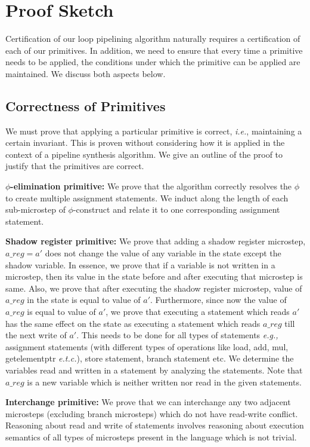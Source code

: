 \section{Proof Sketch}
\label{sec:proof}

Certification of our loop pipelining algorithm naturally requires a certification of each of our primitives. In addition, we need to ensure that every time a primitive needs to be applied, the conditions under which the primitive can be applied are maintained. We discuss both aspects below.

\subsection{Correctness of Primitives}
We must prove that applying a particular primitive is correct, 
{\em i.e.}, maintaining a certain invariant. This is proven without
considering how it is applied in the context of a pipeline
synthesis algorithm. We give an outline of the proof to justify 
that the primitives are correct.

{\bf $\phi$-elimination primitive:} We prove that the algorithm correctly resolves the $\phi$ to create multiple assignment statements. We induct along the length of each sub-microstep of $\phi$-construct and
relate it to one corresponding assignment statement.

{\bf Shadow register primitive:} We prove that adding
  a shadow register microstep, $a\_reg = a'$ does not change the value of any variable in 
  the state except the shadow variable. In essence, we prove
  that if a variable is not written in a microstep, then its value in the state before and after executing
  that microstep is same. Also, we prove that after executing the shadow register microstep,
  value of $a\_reg$ in the state is equal to value of $a'$. Furthermore, since now
  the value of $a\_reg$ is equal to value
  of $a'$, we prove that executing a statement which reads $a'$ has the same
  effect on the state as executing a statement which reads
  $a\_reg$ till the next write of $a'$. This needs to be done for all types of
  statements {\em e.g.,} assignment statements (with different types of 
  operations like load, add, mul, getelementptr {\em e.t.c.}), 
  store statement, branch statement etc. We determine the variables read and 
  written in a statement by analyzing the statements. 
  Note that $a\_reg$ is a new variable which
  is neither written nor read in the given statements.

  {\bf Interchange primitive:} We prove that we can interchange any two adjacent microsteps
 (excluding branch microsteps) which do not have read-write conflict. Reasoning about read and
  write of statements involves reasoning about execution
  semantics of all types of microsteps present in the
  language which is not trivial.

